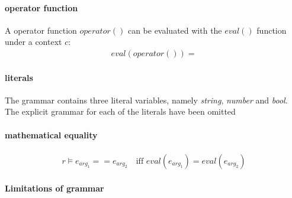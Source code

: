 \paragraph{operator function}
\begin{lemma}
A operator function $operator()$ can be evaluated with the $eval()$ function under a context $c$:
\begin{align*}
    eval(operator()) = 
\end{align*}
\end{lemma}

\paragraph{literals}
The grammar contains three literal variables, namely \emph{string}, \emph{number} and \emph{bool}. The explicit grammar for each of the literals have been omitted

\paragraph{mathematical equality}

\begin{align*}
    r \models e_{arg_1} == e_{arg_2} \quad \text{iff } eval(e_{arg_1}) = eval(e_{arg_2})
\end{align*}


\paragraph{Limitations of grammar}